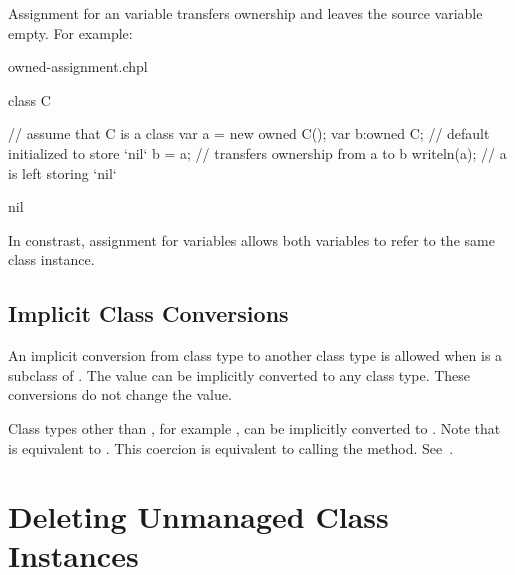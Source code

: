 Assignment for an  variable transfers ownership and leaves the
source variable empty. For example:

\begin{chapelexample}{owned-assignment.chpl}
\begin{chapelpre}
class C { }
\end{chapelpre}
\begin{chapel}
// assume that C is a class
var a = new owned C();
var b:owned C; // default initialized to store `nil`
b = a; // transfers ownership from a to b
writeln(a); // a is left storing `nil`
\end{chapel}
\begin{chapeloutput}
nil
\end{chapeloutput}
\end{chapelexample}

In constrast, assignment for  variables allows both
variables to refer to the same class instance.

\subsection{Implicit Class Conversions}
\label{Implicit_Class_Conversions}

An implicit conversion from class type  to
another class type  is allowed when  is a subclass
of .
The value  can be implicitly converted to any class type.
These conversions do not change the value.

Class types other than , for example , can
be implicitly converted to . Note that  is
equivalent to .  This coercion is equivalent to calling
the  method.  See~.

\section{Deleting Unmanaged Class Instances}
\label{Class_Delete}

